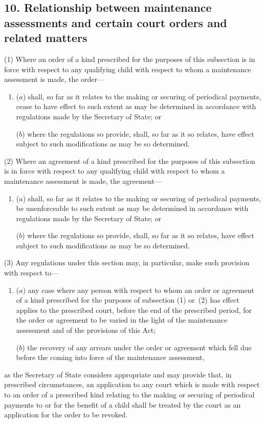 \documentclass[12pt,a4paper]{article}
\begin{document}

\subsection{10. Relationship between maintenance assessments and certain court orders and related matters}

(1) Where an order of a kind prescribed for the purposes of this subsection is in force with respect to any qualifying child with respect to whom a maintenance assessment is made, the order—
\begin{enumerate}\item[]
($a$) shall, so far as it relates to the making or securing of periodical payments, cease to have effect to such extent as may be determined in accordance with regulations made by the Secretary of State; or

($b$) where the regulations so provide, shall, so far as it so relates, have effect subject to such modifications as may be so determined.
\end{enumerate}

(2) Where an agreement of a kind prescribed for the purposes of this subsection is in force with respect to any qualifying child with respect to whom a maintenance assessment is made, the agreement—
\begin{enumerate}\item[]
($a$) shall, so far as it relates to the making or securing of periodical payments, be unenforceable to such extent as may be determined in accordance with regulations made by the Secretary of State; or

($b$) where the regulations so provide, shall, so far as it so relates, have effect subject to such modifications as may be so determined.
\end{enumerate}

(3) Any regulations under this section may, in particular, make such provision with respect to—
\begin{enumerate}\item[]
($a$) any case where any person with respect to whom an order or agreement of a kind prescribed for the purposes of subsection (1)  or~(2)  has effect applies to the prescribed court, before the end of the prescribed period, for the order or agreement to be varied in the light of the maintenance assessment and of the provisions of this Act;

($b$) the recovery of any arrears under the order or agreement which fell due before the coming into force of the maintenance assessment,
\end{enumerate}
as the Secretary of State considers appropriate and may provide that, in prescribed circumstances, an application to any court which is made with respect to an order of a prescribed kind relating to the making or securing of periodical payments to or for the benefit of a child shall be treated by the court as an application for the order to be revoked.
\end{document}
